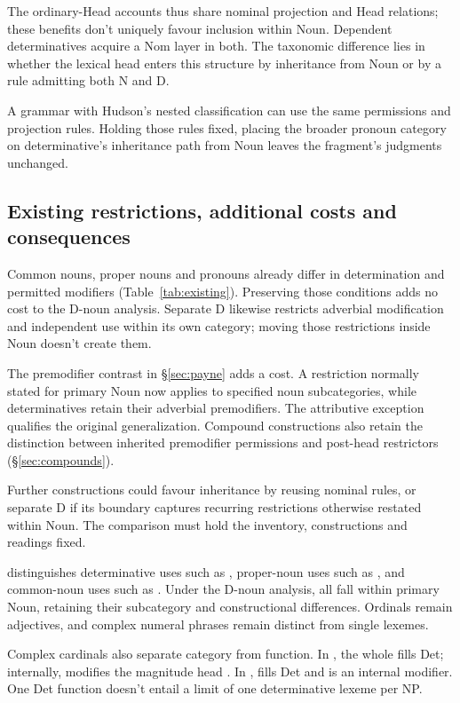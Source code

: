 \documentclass[12pt]{article}
\begin{document}
The ordinary-Head accounts thus share nominal projection and Head relations; these benefits don't uniquely favour inclusion within Noun. Dependent determinatives acquire a Nom layer in both. The taxonomic difference lies in whether the lexical head enters this structure by inheritance from Noun or by a rule admitting both N and D.

A grammar with Hudson's nested classification can use the same permissions and projection rules. Holding those rules fixed, placing the broader pronoun category on determinative's inheritance path from Noun leaves the fragment's judgments unchanged.

\subsection{Existing restrictions, additional costs and consequences}\label{sec:costs}

Common nouns, proper nouns and pronouns already differ in determination and permitted modifiers (Table~\ref{tab:existing}). Preserving those conditions adds no cost to the D-noun analysis. Separate D likewise restricts adverbial modification and independent use within its own category; moving those restrictions inside Noun doesn't create them.

The premodifier contrast in §\ref{sec:payne} adds a cost. A restriction normally stated for primary Noun now applies to specified noun subcategories, while determinatives retain their adverbial premodifiers. The attributive  exception qualifies the original generalization. Compound constructions also retain the distinction between inherited premodifier permissions and post-head restrictors (§\ref{sec:compounds}).

Further constructions could favour inheritance by reusing nominal rules, or separate D if its boundary captures recurring restrictions otherwise restated within Noun. The comparison must hold the inventory, constructions and readings fixed.

\textcite{reynolds2026numerals} distinguishes determinative uses such as , proper-noun uses such as , and common-noun uses such as . Under the D-noun analysis, all fall within primary Noun, retaining their subcategory and constructional differences. Ordinals remain adjectives, and complex numeral phrases remain distinct from single lexemes.

Complex cardinals also separate category from function. In , the whole  fills Det; internally,  modifies the magnitude head  \citep[§4]{reynolds2026numerals}. In ,  fills Det and  is an internal modifier. One Det function doesn't entail a limit of one determinative lexeme per NP.
\end{document}
